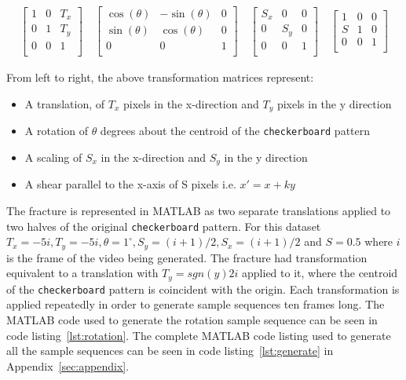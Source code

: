 \begin{align*}
  \begin{bmatrix}
  1 & 0 & T_x \\
  0 & 1 & T_y \\
  0 & 0 & 1 \\
  \end{bmatrix}
  \hspace{1em}
  \begin{bmatrix}
  \cos(\theta) & -\sin(\theta) & 0 \\
  \sin(\theta) & \cos(\theta) & 0 \\
  0 & 0 & 1 \\
  \end{bmatrix}
  \hspace{1em}
  \begin{bmatrix}
  S_x & 0 & 0 \\
  0 & S_y & 0 \\
  0 & 0 & 1 \\
  \end{bmatrix}
  \hspace{1em}
  \begin{bmatrix}
  1 & 0 & 0 \\
  S & 1 & 0 \\
  0 & 0 & 1 \\
  \end{bmatrix}
\end{align*}

From left to right, the above transformation matrices represent: 
\begin{itemize}
  \item A translation, of $T_x$ pixels in the x-direction and $T_y$ pixels in the y direction
  \item A rotation of $\theta$ degrees about the centroid of the \verb|checkerboard| pattern
  \item A scaling of $S_x$ in the x-direction and $S_y$ in the y direction
  \item A shear parallel to the x-axis of S pixels i.e. $x' = x + ky$
\end{itemize}

The fracture is represented in MATLAB as two separate translations applied to two halves of the original \verb|checkerboard| pattern. For this dataset $T_x = -5i, T_y = -5i, \theta = 1^\circ, S_y = (i+1)/2, S_x = (i+1)/2$ and $S = 0.5$ where $i$ is the frame of the video being generated. The fracture had transformation equivalent to a translation with $T_y = sgn(y)2i$ applied to it, where the centroid of the \verb|checkerboard| pattern is coincident with the origin. Each transformation is applied repeatedly in order to generate sample sequences ten frames long. The MATLAB code used to generate the rotation sample sequence can be seen in code listing~\ref{lst:rotation}. The complete MATLAB code listing used to generate all the sample sequences can be seen in code listing~\ref{lst:generate} in Appendix~\ref{sec:appendix}.

